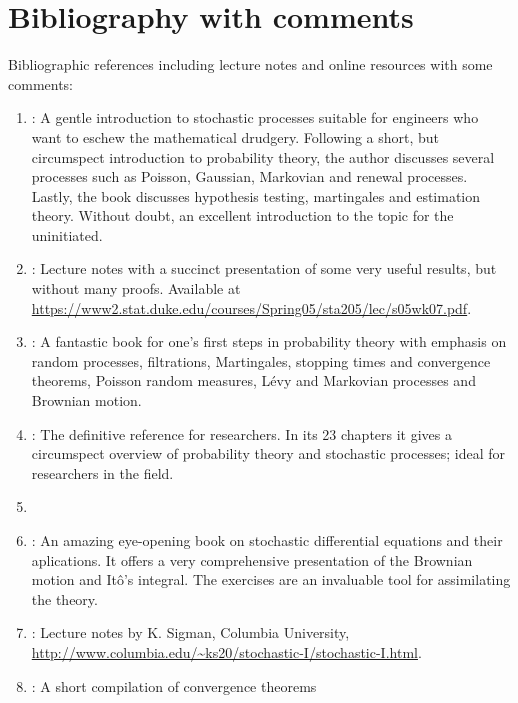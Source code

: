 \documentclass[a4paper,10pt]{scrbook}
\let\oldbibentry\bibentry
\renewcommand{\bibentry}[1]{{\color{blue} \oldbibentry{#1}}}
\begin{document}
\chapter{Bibliography with comments}
%
Bibliographic references including lecture notes and online resources with some comments:
{\small
\begin{enumerate}
 \item \label{cite:Gallager2013} : A gentle introduction to stochastic 
        processes suitable for engineers who want to eschew the mathematical drudgery. 
        Following a short, but circumspect introduction to probability theory, the author 
        discusses several processes such as Poisson, Gaussian, Markovian and renewal processes. 
        Lastly, the book discusses hypothesis testing, martingales and estimation theory. 
        Without doubt, an excellent introduction to the topic for the uninitiated. 
 \item \label{cite:RLWolpert05} : Lecture notes with a succinct presentation 
	of some very useful results, but without many proofs. 
	Available at \url{https://www2.stat.duke.edu/courses/Spring05/sta205/lec/s05wk07.pdf}.
 \item \label{cite:cinlar2011} : A fantastic book for one's first 
       steps in probability theory with 
       emphasis on random processes, filtrations, Martingales, stopping times and convergence 
       theorems, Poisson random measures, L{\'{e}}vy and Markovian processes and Brownian motion.
 \item \label{cite:Kallnberg} : The definitive reference for researchers. In its 23 chapters
       it gives a circumspect overview of probability theory and stochastic processes; ideal for researchers in the field.
 \item \label{cite:HernandezLassere1996}     
 \item \label{cite:oksendal2003} : An amazing eye-opening book on stochastic differential 
	equations and their aplications. It offers a very comprehensive presentation of the Brownian 
	motion and It\^{o}'s integral. The exercises are an invaluable tool for assimilating the theory.
 \item \label{cite:KSigman2009}: Lecture notes by K. Sigman, Columbia University,
       \url{http://www.columbia.edu/~ks20/stochastic-I/stochastic-I.html}.
 \item \label{cite:DWalnut2011} : A short compilation of convergence theorems       

\end{enumerate}}
\end{document}
